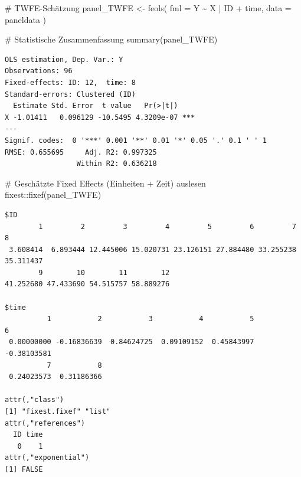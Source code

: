 \documentclass[
  a4paper,
  DIV=11,
  oneside]{scrreprt}
\newenvironment{Shaded}{\begin{snugshade}}{\end{snugshade}}
\newcommand{\AttributeTok}[1]{\textcolor[rgb]{0.40,0.45,0.13}{#1}}
\newcommand{\CommentTok}[1]{\textcolor[rgb]{0.37,0.37,0.37}{#1}}
\newcommand{\FunctionTok}[1]{\textcolor[rgb]{0.28,0.35,0.67}{#1}}
\newcommand{\NormalTok}[1]{\textcolor[rgb]{0.00,0.23,0.31}{#1}}
\newcommand{\OtherTok}[1]{\textcolor[rgb]{0.00,0.23,0.31}{#1}}
\newcommand{\SpecialCharTok}[1]{\textcolor[rgb]{0.37,0.37,0.37}{#1}}
\begin{document}
\begin{Shaded}
\begin{Highlighting}[]
\CommentTok{\# TWFE{-}Schätzung}
\NormalTok{panel\_TWFE }\OtherTok{\textless{}{-}} \FunctionTok{feols}\NormalTok{(}
  \AttributeTok{fml =}\NormalTok{ Y }\SpecialCharTok{\textasciitilde{}}\NormalTok{ X }\SpecialCharTok{|}\NormalTok{ ID }\SpecialCharTok{+}\NormalTok{ time,  }
  \AttributeTok{data =}\NormalTok{ paneldata}
\NormalTok{)}

\CommentTok{\# Statistische Zusammenfassung}
\FunctionTok{summary}\NormalTok{(panel\_TWFE)}
\end{Highlighting}
\end{Shaded}

\begin{verbatim}
OLS estimation, Dep. Var.: Y
Observations: 96
Fixed-effects: ID: 12,  time: 8
Standard-errors: Clustered (ID) 
  Estimate Std. Error  t value   Pr(>|t|)    
X -1.01411   0.096129 -10.5495 4.3209e-07 ***
---
Signif. codes:  0 '***' 0.001 '**' 0.01 '*' 0.05 '.' 0.1 ' ' 1
RMSE: 0.655695     Adj. R2: 0.997325
                 Within R2: 0.636218
\end{verbatim}

\begin{Shaded}
\begin{Highlighting}[]
\CommentTok{\# Geschätzte Fixed Effects (Einheiten + Zeit) auslesen}
\NormalTok{fixest}\SpecialCharTok{::}\FunctionTok{fixef}\NormalTok{(panel\_TWFE)}
\end{Highlighting}
\end{Shaded}

\begin{verbatim}
$ID
        1         2         3         4         5         6         7         8 
 3.608414  6.893444 12.445006 15.020731 23.126151 27.884480 33.255238 35.311437 
        9        10        11        12 
41.252680 47.433690 54.515757 58.889276 

$time
          1           2           3           4           5           6 
 0.00000000 -0.16836639  0.84624725  0.09109152  0.45843997 -0.38103581 
          7           8 
 0.24023573  0.31186366 

attr(,"class")
[1] "fixest.fixef" "list"        
attr(,"references")
  ID time 
   0    1 
attr(,"exponential")
[1] FALSE
\end{verbatim}
\end{document}
